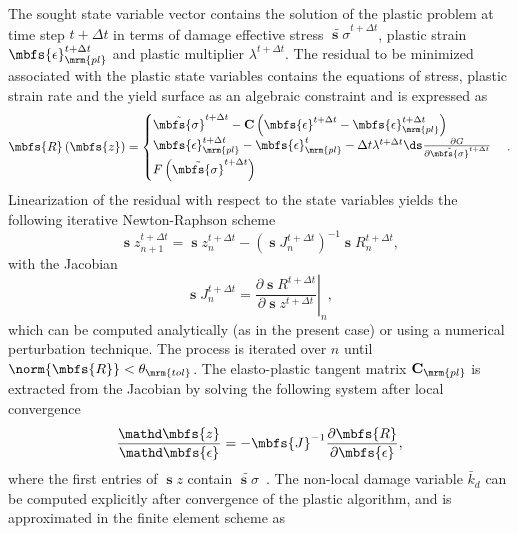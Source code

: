The sought state variable vector contains the solution of the plastic problem at time step $t+\Delta t$ in terms of damage effective stress $\tilde{\mbfs{\sigma}}^{t+\Delta t}$, plastic strain $\mbfs{\epsilon}_\mrm{pl}^{t+\Delta t}$ and plastic multiplier $\lambda^{t+\Delta t}$. The residual to be minimized associated with the plastic state variables contains the equations of stress, plastic strain rate and the yield surface as an algebraic constraint and is expressed as
\begin{equation}\label{eq:resid}
\mbfs{R}\left( \mbfs{z} \right)=
\begin{cases}
\tilde{\mbfs{\sigma}}^{t+\Delta t} - \mathbf{C} \left( \mbfs{\epsilon}^{t+\Delta t} - \mbfs{\epsilon}^{t+\Delta t}_\mrm{pl}\right)
\\
\mbfs{\epsilon}_\mrm{pl}^{t+\Delta t} - \mbfs{\epsilon}_\mrm{pl}^{t} - \Delta t\lambda^{t+\Delta t} \ds \frac{\partial G}{\partial \tilde{\mbfs{\sigma}}^{t+\Delta t}}
\\
F\left( \tilde{\mbfs{\sigma}}^{t+\Delta t} \right) 
\end{cases}.
\end{equation}
Linearization of the residual with respect to the state variables yields the following iterative Newton-Raphson scheme
\begin{equation}\label{eq:sol}
\mbfs{z}^{t+\Delta t}_{n+1}=\mbfs{z}^{t+\Delta t}_{n}-\left( \mbfs{J}^{t+\Delta t}_{n} \right)^{-1} \mbfs{R}^{t+\Delta t}_{n},
\end{equation}
with the Jacobian
\begin{equation}\label{eq:jac}
\mbfs{J}^{t+\Delta t}_{n}= \left. \frac{\partial \mbfs{R}^{t+\Delta t}}{\partial \mbfs{z}^{t+\Delta t}} \right|_{n},
\end{equation}
which can be computed analytically (as in the present case) or using a numerical perturbation technique. The process is iterated over $n$ until $\norm{\mbfs{R}} <\theta_\mrm{tol}$. The elasto-plastic tangent matrix $\mathbf{C}_\mrm{pl}$ is extracted from the Jacobian by solving the following system after local convergence 
\begin{equation}\label{eq:tangent}
\frac{\mathd \mbfs{z}}{\mathd \mbfs{\epsilon}} = - \mbfs{J}^{-1} \frac{\partial \mbfs{R}}{\partial  \mbfs{\epsilon}} ,
\end{equation}
where the first entries of $\mbfs{z}$ contain $\tilde{\mbfs{\sigma}}$~\cite{Nagel2017}. 
The non-local damage variable $\bar{k}_d$ can be computed explicitly after convergence of the plastic algorithm, and is approximated in the finite element scheme as
